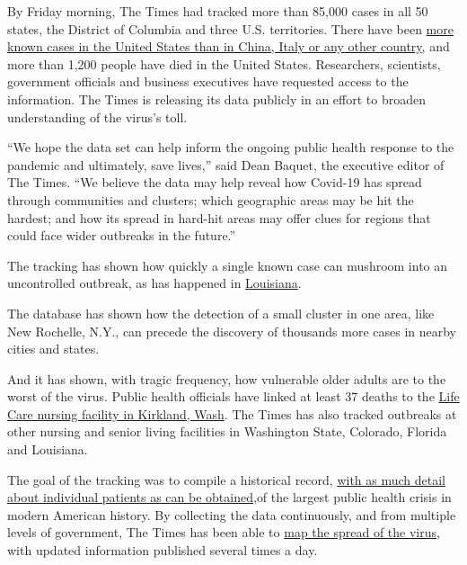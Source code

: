 By Friday morning, The Times had tracked more than 85,000 cases in all
50 states, the District of Columbia and three U.S. territories. There
have been
\href{https://www.nytimes3xbfgragh.onion/2020/03/26/health/usa-coronavirus-cases.html}{more
known cases in the United States than in China, Italy or any other
country}, and more than 1,200 people have died in the United States.
Researchers, scientists, government officials and business executives
have requested access to the information. The Times is releasing its
data publicly in an effort to broaden understanding of the virus's toll.

``We hope the data set can help inform the ongoing public health
response to the pandemic and ultimately, save lives,'' said Dean Baquet,
the executive editor of The Times. ``We believe the data may help reveal
how Covid-19 has spread through communities and clusters; which
geographic areas may be hit the hardest; and how its spread in hard-hit
areas may offer clues for regions that could face wider outbreaks in the
future.''

The tracking has shown how quickly a single known case can mushroom into
an uncontrolled outbreak, as has happened in
\href{https://www.nytimes3xbfgragh.onion/2020/03/26/us/coronavirus-louisiana-new-orleans.html}{Louisiana}.

The database has shown how the detection of a small cluster in one area,
like New Rochelle, N.Y., can precede the discovery of thousands more
cases in nearby cities and states.

And it has shown, with tragic frequency, how vulnerable older adults are
to the worst of the virus. Public health officials have linked at least
37 deaths to the
\href{https://www.nytimes3xbfgragh.onion/2020/03/21/us/coronavirus-nursing-home-kirkland-life-care.html}{Life
Care nursing facility in Kirkland, Wash}. The Times has also tracked
outbreaks at other nursing and senior living facilities in Washington
State, Colorado, Florida and Louisiana.

The goal of the tracking was to compile a historical record,
\href{https://www.nytimes3xbfgragh.onion/interactive/2020/03/21/us/coronavirus-us-cases-spread.html}{with
as much detail about individual patients as can be obtained,}of the
largest public health crisis in modern American history. By collecting
the data continuously, and from multiple levels of government, The Times
has been able to
\href{https://www.nytimes3xbfgragh.onion/interactive/2020/us/coronavirus-us-cases.html}{map
the spread of the virus}, with updated information published several
times a day.

